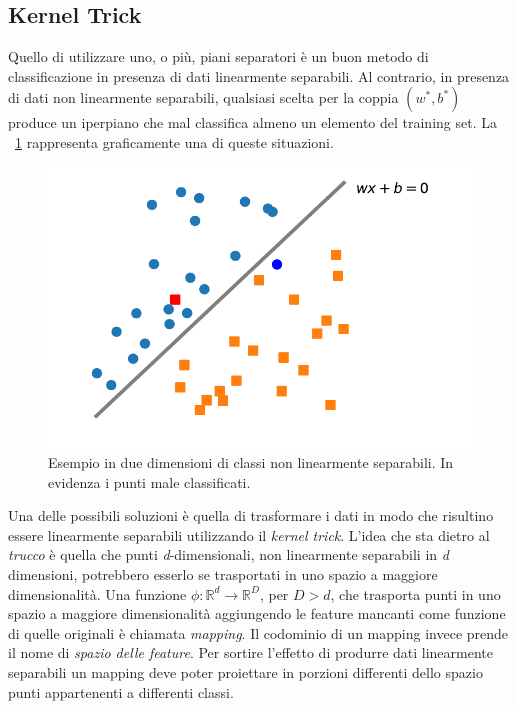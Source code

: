 \documentclass [11pt,a4paper,twoside,openright] {book}
\begin{document}
\subsection{Kernel Trick}
Quello di utilizzare uno, o più, piani separatori è un buon metodo di classificazione in presenza di dati linearmente separabili. Al contrario, in presenza di dati non linearmente separabili, qualsiasi scelta per la coppia $(w^*, b^*)$ produce un iperpiano che mal classifica almeno un elemento del training set. La  \figurename~\ref{nonseparabili} rappresenta graficamente una di queste situazioni.\\
\begin{figure}[!h]
\centering
\includegraphics[scale=.6]{figure/nonseparabili.pdf}
\caption{Esempio in due dimensioni di classi non linearmente separabili. In evidenza i punti male classificati. \label{nonseparabili}}
\end{figure}Una delle possibili soluzioni è quella di trasformare i dati in modo che risultino essere linearmente separabili utilizzando il \textit{kernel trick}. L'idea che sta dietro al \textit{trucco} è quella che punti \textit{d}-dimensionali, non linearmente separabili in \textit{d} dimensioni, potrebbero esserlo se trasportati in uno spazio a maggiore dimensionalità. Una funzione $\phi: \mathbb{R}^d \rightarrow \mathbb{R}^D$, per $D > d$, che trasporta punti in uno spazio a maggiore dimensionalità aggiungendo le feature mancanti come funzione di quelle originali è chiamata \textit{mapping}. Il codominio di un mapping invece prende il nome di \textit{spazio delle feature}. Per sortire l'effetto di produrre dati linearmente separabili un mapping deve poter proiettare in porzioni differenti dello spazio punti appartenenti a differenti classi.\\\\
\end{document}
